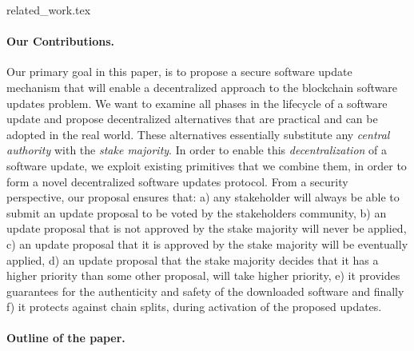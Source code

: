 {related_work.tex}

\paragraph{Our Contributions.} Our primary goal in this paper, is to propose a secure software update mechanism that will enable a decentralized approach to the blockchain software updates problem. We want to examine all phases in the lifecycle of a software update and propose decentralized alternatives that are practical and can be adopted in the real world. These alternatives essentially substitute any \emph{central authority} with the \emph{stake majority}. In order to enable this \emph{decentralization} of a software update, we exploit existing primitives that we combine them, in order to form a novel decentralized software updates protocol. From a security perspective, our proposal ensures that:
a) any stakeholder will always be able to submit an update proposal to be voted by the stakeholders community, b) an update proposal that is not approved by the stake majority will never be applied, c) an update proposal that it is approved by the stake majority will be eventually applied, d) an update proposal that the stake majority decides that it has a higher priority than some other proposal, will take higher priority, e) it provides guarantees for the authenticity and safety of the downloaded software and finally f) it protects against chain splits, during activation of the proposed updates.

\paragraph{Outline of the paper.}
